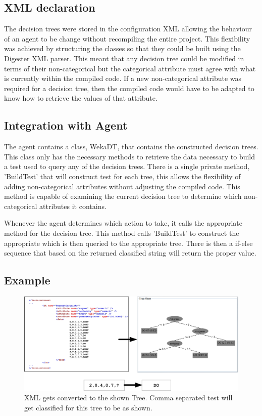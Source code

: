 \subsection{XML declaration}

The decision trees were stored in the configuration XML allowing the behaviour of an agent to be change without
recompiling the entire project.  This flexibility was achieved by structuring the classes so that 
they could be built using the Digester XML parser.  This meant that any decision tree could be modified in 
terms of their non-categorical but the categorical attribute must agree with what is currently within the 
compiled code.  If a new non-categorical attribute was required for a decision tree, then the compiled code would
have to be adapted to know how to retrieve the values of that attribute.

\subsection{Integration with Agent}

The agent contains a class, WekaDT, that contains the constructed decision trees.  This class only has
the necessary methods to retrieve the data necessary to build a test used to query any of the decision
trees.  There is a single private method, 'BuildTest' that will construct test for each tree, this allows the flexibility
of adding non-categorical attributes without adjusting the compiled code.  This method is capable of
examining the current decision tree to determine which non-categorical attributes it contains.

Whenever the agent determines which action to take, it calls the appropriate method for the decision 
tree.  This method calls 'BuildTest' to construct the appropriate which is then queried to the
appropriate tree.  There is then a if-else sequence that based on the returned classified string
will return the proper value.

\subsection{Example}

\begin{figure}
  \centering
  \label{fig:xml2dt}
  \includegraphics[width=1\textwidth]{images/XML2DT.jpg}
  \caption{XML gets converted to the shown Tree.  Comma separated test will get
classified for this tree to be as shown.}
\end{figure}

